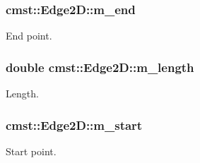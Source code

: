 \subsubsection[{\texorpdfstring{m\+\_\+end}{m_end}}]{ cmst\+::\+Edge2\+D\+::m\+\_\+end\hspace{0.3cm}{\ttfamily [private]}}\hypertarget{classcmst_1_1_edge2_d_a26aabda4fcc506ae340392e78f92e49b}{}\label{classcmst_1_1_edge2_d_a26aabda4fcc506ae340392e78f92e49b}


End point. 

\subsubsection[{\texorpdfstring{m\+\_\+length}{m_length}}]{\setlength{\rightskip}{0pt plus 5cm}double cmst\+::\+Edge2\+D\+::m\+\_\+length\hspace{0.3cm}{\ttfamily [private]}}\hypertarget{classcmst_1_1_edge2_d_ab461fb636aa7f76af613c63c681c186e}{}\label{classcmst_1_1_edge2_d_ab461fb636aa7f76af613c63c681c186e}


Length. 

\subsubsection[{\texorpdfstring{m\+\_\+start}{m_start}}]{ cmst\+::\+Edge2\+D\+::m\+\_\+start\hspace{0.3cm}{\ttfamily [private]}}\hypertarget{classcmst_1_1_edge2_d_a8c0ca77824a84a48c714aaec5da72ad7}{}\label{classcmst_1_1_edge2_d_a8c0ca77824a84a48c714aaec5da72ad7}


Start point. 

